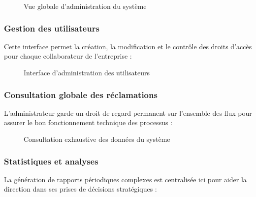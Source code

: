 \begin{figure}[H]
    \centering
    \caption{Vue globale d'administration du système}
    \label{fig:admin-main}
\end{figure}

\subsubsection{Gestion des utilisateurs}
Cette interface permet la création, la modification et le contrôle des droits d'accès pour chaque collaborateur de l'entreprise :

\begin{figure}[H]
    \centering
    \caption{Interface d'administration des utilisateurs}
    \label{fig:admin-users}
\end{figure}

\subsubsection{Consultation globale des réclamations}
L'administrateur garde un droit de regard permanent sur l'ensemble des flux pour assurer le bon fonctionnement technique des processus :

\begin{figure}[H]
    \centering
    \caption{Consultation exhaustive des données du système}
    \label{fig:admin-view}
\end{figure}

\subsubsection{Statistiques et analyses}
La génération de rapports périodiques complexes est centralisée ici pour aider la direction dans ses prises de décisions stratégiques :

